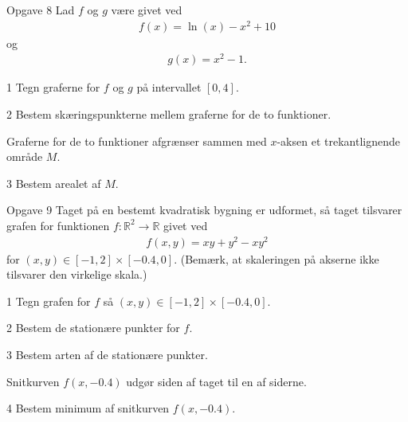 \begin{opgavetekst}{Opgave 8}
	Lad $f$ og $g$ være givet ved
	\begin{align*}
		f(x) = \ln(x)-x^2+10
	\end{align*}
	og 
	\begin{align*}
		g(x) = x^2-1.
	\end{align*}
\end{opgavetekst}
\begin{delopgave}{}{1}
	Tegn graferne for $f$ og $g$ på intervallet $[0,4]$.
\end{delopgave}
\begin{delopgave}{}{2}
	Bestem skæringspunkterne mellem graferne for de to funktioner. 
\end{delopgave}
\begin{meretekst}
	Graferne for de to funktioner afgrænser sammen med $x$-aksen et trekantlignende område $M$.
\end{meretekst}
\begin{delopgave}{}{3}
	Bestem arealet af $M$. 
\end{delopgave}

\newpage

\begin{opgavetekst}{Opgave 9}
	Taget på en bestemt kvadratisk bygning er udformet, så taget tilsvarer grafen for funktionen $f:\mathbb{R}^2 \to \mathbb{R}$ givet ved
	\begin{align*}
		f(x,y) = xy + y^2 -xy^2
	\end{align*}
	for $(x,y) \in [-1,2]\times [-0.4,0]$. (Bemærk, at skaleringen på akserne ikke tilsvarer den virkelige skala.)
\end{opgavetekst}
\begin{delopgave}{}{1}
	Tegn grafen for $f$ så $(x,y) \in [-1,2] \times [-0.4,0]$. 
\end{delopgave}
\begin{delopgave}{}{2}
	Bestem de stationære punkter for $f$. 
\end{delopgave}
\begin{delopgave}{}{3}
	Bestem arten af de stationære punkter. 
\end{delopgave}
\begin{meretekst}
	Snitkurven $f(x,-0.4)$ udgør siden af taget til en af siderne.
\end{meretekst}
\begin{delopgave}{}{4}
	Bestem minimum af snitkurven $f(x,-0.4)$. 
\end{delopgave}